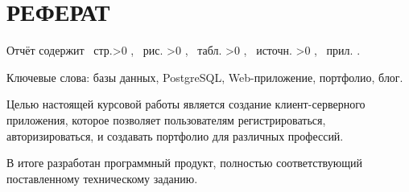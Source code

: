\chapter*{\hfill{}РЕФЕРАТ\hfill{}}%
\label{cha:referat}

Отчёт содержит~\pageref{LastPage} стр.\ifnum \totfig>0
, \totfig~рис.%
\fi
\ifnum \tottab >0
, \tottab~табл.%
\fi
%
\ifnum \totbib >0
, \totbib~источн.%
\fi
%
\ifnum \totapp >0
, \totapp~прил.%
\else
.%
\fi

\sloppy Ключевые слова: базы данных, PostgreSQL, Web-приложение, портфолио, блог.

\sloppy Целью настоящей курсовой работы является создание клиент-серверного приложения, которое позволяет пользователям регистрироваться, авторизироваться, и создавать портфолио для различных профессий.

\sloppy В итоге разработан программный продукт, полностью соответствующий поставленному техническому заданию.
